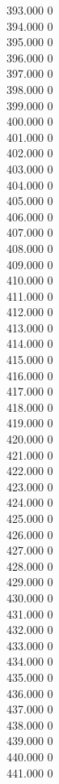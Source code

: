 { 393.000	0 \\
 394.000	0 \\
 395.000	0 \\
 396.000	0 \\
 397.000	0 \\
 398.000	0 \\
 399.000	0 \\
 400.000	0 \\
 401.000	0 \\
 402.000	0 \\
 403.000	0 \\
 404.000	0 \\
 405.000	0 \\
 406.000	0 \\
 407.000	0 \\
 408.000	0 \\
 409.000	0 \\
 410.000	0 \\
 411.000	0 \\
 412.000	0 \\
 413.000	0 \\
 414.000	0 \\
 415.000	0 \\
 416.000	0 \\
 417.000	0 \\
 418.000	0 \\
 419.000	0 \\
 420.000	0 \\
 421.000	0 \\
 422.000	0 \\
 423.000	0 \\
 424.000	0 \\
 425.000	0 \\
 426.000	0 \\
 427.000	0 \\
 428.000	0 \\
 429.000	0 \\
 430.000	0 \\
 431.000	0 \\
 432.000	0 \\
 433.000	0 \\
 434.000	0 \\
 435.000	0 \\
 436.000	0 \\
 437.000	0 \\
 438.000	0 \\
 439.000	0 \\
 440.000	0 \\
 441.000	0 \\
}
